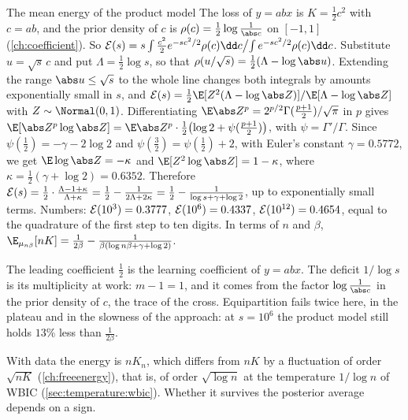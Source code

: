 \begin{refsection}
\begin{computation}{The mean energy of the product model}\label{comp:temperature:product}
\step The loss of $y=abx$ is $K=\frac12c^2$ with $c=ab$, and the prior density of $c$ is $\rho(c)=\frac12\log\frac1{\abs c}$ on $[-1,1]$ (\cref{ch:coefficient}). So $\temperatureE(s)=s\int\frac{c^2}2e^{-sc^2/2}\rho(c)\dd c\big/\!\int e^{-sc^2/2}\rho(c)\dd c$.
\step Substitute $u=\sqrt s\,c$ and put $\Lambda=\frac12\log s$, so that $\rho(u/\sqrt s)=\frac12(\Lambda-\log\abs u)$. Extending the range $\abs u\le\sqrt s$ to the whole line changes both integrals by amounts exponentially small in $s$, and $\temperatureE(s)=\frac12\E[Z^2(\Lambda-\log\abs Z)]/\E[\Lambda-\log\abs Z]$ with $Z\sim\Normal(0,1)$.
\step Differentiating $\E\abs Z^p=2^{p/2}\Gamma(\frac{p+1}2)/\sqrt\pi$ in $p$ gives $\E[\abs Z^p\log\abs Z]=\E\abs Z^p\cdot\frac12\bigl(\log2+\psi(\frac{p+1}2)\bigr)$, with $\psi=\Gamma'/\Gamma$. Since $\psi(\frac12)=-\gamma-2\log2$ and $\psi(\frac32)=\psi(\frac12)+2$, with Euler's constant $\gamma=0.5772$, we get $\E\log\abs Z=-\kappa$ and $\E[Z^2\log\abs Z]=1-\kappa$, where $\kappa=\frac12(\gamma+\log2)=0.6352$.
\step Therefore $\mathcal{E}(s)=\frac12\cdot\frac{\Lambda-1+\kappa}{\Lambda+\kappa}=\frac12-\frac1{2\Lambda+2\kappa}=\frac12-\frac1{\log s+\gamma+\log2}$, up to exponentially small terms.
\step Numbers: $\mathcal{E}(10^3)=0.3777$, $\mathcal{E}(10^6)=0.4337$, $\mathcal{E}(10^{12})=0.4654$, equal to the quadrature of the first step to ten digits. In terms of $n$ and $\beta$, $\E_{\mu_{n\beta}}[nK]=\frac1{2\beta}-\frac1{\beta(\log n\beta+\gamma+\log2)}$.
\end{computation}

The leading coefficient $\frac12$ is the learning coefficient of $y=abx$. The deficit $1/\log s$ is its multiplicity at work: $m-1=1$, and it comes from the factor $\log\frac1{\abs c}$ in the prior density of $c$, the trace of the cross. Equipartition fails twice here, in the plateau and in the slowness of the approach: at $s=10^6$ the product model still holds $13\%$ less than $\frac1{2\beta}$.

With data the energy is $nK_n$, which differs from $nK$ by a fluctuation of order $\sqrt{nK}$ (\cref{ch:freeenergy}), that is, of order $\sqrt{\log n}$ at the temperature $1/\log n$ of WBIC (\cref{sec:temperature:wbic}). Whether it survives the posterior average depends on a sign.


\end{refsection}
